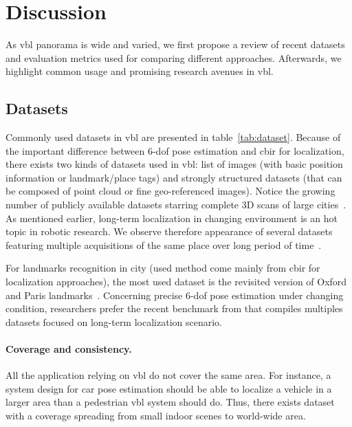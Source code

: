 \section{Discussion}
\label{sec:comparison}
	As \ac{vbl} panorama is wide and varied, we first propose a review of recent datasets and evaluation metrics used for comparing different approaches. Afterwards, we highlight common usage and promising research avenues in \ac{vbl}.
	
	\subsection{Datasets}
		Commonly used datasets in \ac{vbl} are presented in table~\ref{tab:dataset}. Because of the important difference between 6-\ac{dof} pose estimation and \ac{cbir} for localization, there exists two kinds of datasets used in \ac{vbl}: list of images (with basic position information or landmark/place tags) and strongly structured datasets (that can be composed of point cloud or fine geo-referenced images). Notice the growing number of publicly available datasets starring complete 3D scans of large cities~\citep{Menze2015,Maddern2016,Wang2016}. As mentioned earlier, long-term localization in changing environment is an hot topic in robotic research. We observe therefore appearance of several datasets featuring multiple acquisitions of the same place over long period of time~\citep{Maddern2016,Carlevaris-Bianco2016,Krajnik2010,Krajnik2014}.
		
		For landmarks recognition in city (used method come mainly from \ac{cbir} for localization approaches), the most used dataset is the revisited version of Oxford and Paris landmarks~\citep{Radenovic2018}. Concerning precise 6-\ac{dof} pose estimation under changing condition, researchers prefer the recent benchmark from \citet{Sattler2018} that compiles multiples datasets focused on long-term localization scenario.
		
		\paragraph{Coverage and consistency.}
		\label{para:coverage_consistency}
		All the application relying on \ac{vbl} do not cover the same area. For instance, a system design for car pose estimation should be able to localize a vehicle in a larger area than a pedestrian \ac{vbl} system should do. Thus, there exists dataset with a coverage spreading from small indoor scenes to world-wide area.
	
